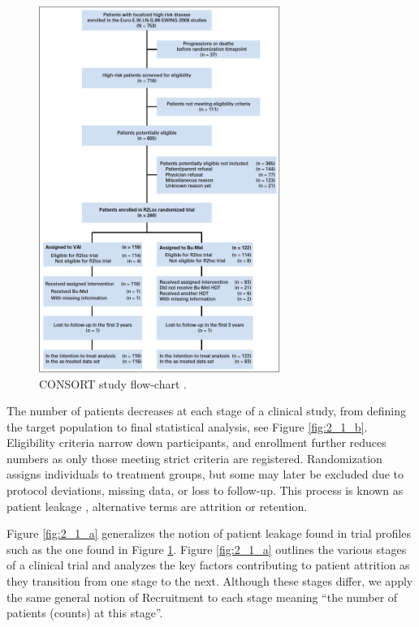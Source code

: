 \begin{figure}[h]
  \centering
  \includegraphics[width=0.7\textwidth]{whelan_flow.png}
  \caption{CONSORT study flow-chart \citep{whelan2018high, schulz2010consort, hopewell2025consort}.}
  \label{fig:2_0}
\end{figure}

The number of patients decreases at each stage of a clinical study, from defining the target population to final statistical analysis, see Figure \ref{fig:2_1_b}. Eligibility criteria narrow down participants, and enrollment further reduces numbers as only those meeting strict criteria are registered. Randomization assigns individuals to treatment groups, but some may later be excluded due to protocol deviations, missing data, or loss to follow-up. This process is known as patient leakage \citep{desai2014preventing}, alternative terms are attrition or retention.

Figure \ref{fig:2_1_a} generalizes the notion of patient leakage found in trial profiles such as the one found in Figure \ref{fig:2_0}. Figure \ref{fig:2_1_a} outlines the various stages of a clinical trial and analyzes the key factors contributing to patient attrition as they transition from one stage to the next. Although these stages differ, we apply the same general notion of Recruitment to each stage meaning ``the number of patients (counts) at this stage''.




